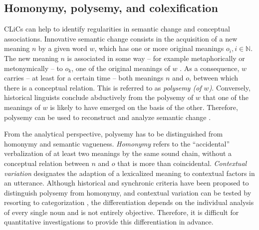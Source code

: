 \subsection{Homonymy, polysemy, and colexification}
CLiCs can help to identify regularities in semantic
change and conceptual associations. Innovative semantic change consists in the acquisition of a new
meaning $n$ by a given word $w$, which has one or more original meanings $o_{i}, i \in \mathbb{N}$.
The new meaning $n$ is associated in some way -- for example metaphorically or metonymically -- to
$o_k$, one of the original meanings of $w$ \cite{blank1997}. As a consequence, $w$ carries
-- at least for a certain time -- both meanings $n$ and $o$, between which there is a conceptual
relation. This is referred to as \emph{polysemy (of $w$)}. Conversely, historical linguists
conclude abductively from the polysemy of $w$ that one of the meanings of $w$ is likely to have
emerged on the basis of the other. Therefore, polysemy can be used to reconstruct and analyze
semantic change \cite{traugottdasher2002}.
 
From the analytical perspective, polysemy has
to be distinguished from homonymy and semantic vagueness. \emph{Homonymy} refers to the
``accidental'' verbalization of at least two meanings by the same sound chain, without a conceptual
relation between $n$ and $o$ that is more than coincidental. \emph{Contextual variation}
designates the adaption of a lexicalized meaning to contextual factors in an utterance. Although
historical and synchronic criteria have been proposed to distinguish polysemy from homonymy, and
contextual variation can be tested by resorting to categorization \cite{blank1997}, the
differentiation depends on the individual analysis of every single noun and is not entirely
objective. Therefore, it is difficult for quantitative investigations to provide this differentiation
in advance.

